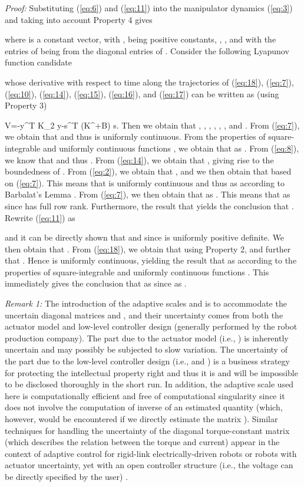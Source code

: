 \documentclass[9pt,technote]{IEEEtran}
\def \be {}
\begin{document}
\emph{Proof:} Substituting (\ref{eq:6}) and (\ref{eq:11}) into the manipulator dynamics (\ref{eq:3}) and taking into account Property 4 gives

where  is a constant vector,  with ,  being positive constants, , , and  with the entries of  being from the diagonal entries of . Consider the following Lyapunov function candidate

 whose derivative with respect to time along the trajectories of (\ref{eq:18}), (\ref{eq:7}), (\ref{eq:10}), (\ref{eq:14}), (\ref{eq:15}), (\ref{eq:16}), and (\ref{eq:17}) can be written as (using Property 3)
\be
\dot V=-\alpha y^T K_2 y-s^T (K^\ast +B) s.
\ee
Then we obtain that , ,  , , , , and .
From (\ref{eq:7}), we obtain that  and thus  is uniformly continuous. From the properties of square-integrable and uniformly continuous functions \cite[p.~232]{Desoer1975_Book}, we obtain that  as . From (\ref{eq:8}), we know that  and thus . From (\ref{eq:14}), we obtain that , giving rise to the boundedness of . From (\ref{eq:2}), we obtain that , and we then obtain that  based on (\ref{eq:7}). This means that  is uniformly continuous and thus  as  according to Barbalat's Lemma \cite{Slotine1991_Book}. From  (\ref{eq:7}), we then obtain that  as .  This means that  as  since  has full row rank. Furthermore, the result that  yields the conclusion that . Rewrite (\ref{eq:11}) as

  and it can be directly shown that  and  since  is uniformly positive definite. We then obtain that .
From (\ref{eq:18}), we obtain that  using Property 2, and further that . Hence  is uniformly continuous, yielding the result that  as  according to the properties of square-integrable and uniformly continuous functions \cite[p.~232]{Desoer1975_Book}. This immediately gives the conclusion that  as  since  as . \hfill {\small }

\emph{Remark 1:} The introduction of the adaptive scales  and  is to accommodate the uncertain diagonal matrices  and , and their uncertainty comes from both the actuator model and low-level controller design (generally performed by the robot production company). The part due to the actuator model (i.e., ) is inherently uncertain and may possibly be subjected to slow variation. The uncertainty of the part due to the low-level controller design (i.e.,  and ) is a business strategy for protecting the intellectual property right and thus it is and will be impossible to be disclosed thoroughly in the short run. In addition, the adaptive scale  used here is computationally efficient and free of computational singularity since it does not involve the computation of inverse of an estimated quantity (which, however, would be encountered if we directly estimate the matrix ). Similar techniques for handling the uncertainty of the diagonal torque-constant matrix (which describes the relation between the torque and current) appear in the context of adaptive control for rigid-link electrically-driven robots or robots with actuator uncertainty, yet with an open controller structure (i.e., the voltage can be directly specified by the user) \cite{Bridges1993_CDC,Cheah2006_TAC}.
\end{document}
